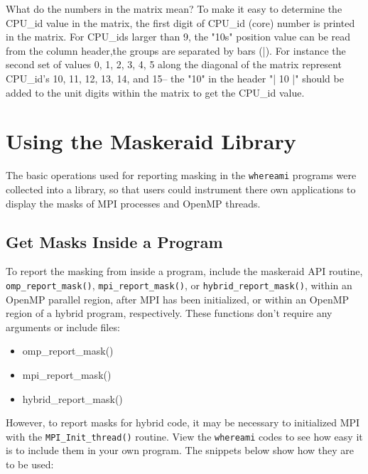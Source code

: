 \documentclass[10pt,a4paper]{report}
\begin{document}
What do the numbers in the matrix mean?
To make it easy to determine the CPU\_id value in the matrix, the first digit of
CPU\_id (core) number is printed in the matrix.  For CPU\_ids larger than 9, the
"10s" position value can be read from the column header,the groups are separated
by bars (|).  For instance the second set of values {0, 1, 2, 3, 4, 5} along the
diagonal of the matrix represent CPU\_id's { 10, 11, 12, 13, 14, and 15}-- the "10"
in the header "|       10     |" should be added to the unit digits within the matrix to get the
CPU\_id value.


\FloatBarrier
\chapter{Using the Maskeraid Library}

The basic operations used for reporting masking in the \verb+whereami+ programs
were collected into a library, so that users
could instrument there own applications to display the masks of MPI processes
and OpenMP threads.

 

\section{Get Masks Inside a Program}

To report the masking from inside a program, include the maskeraid API routine, \verb+omp_report_mask()+,
\verb+mpi_report_mask()+, or \verb+hybrid_report_mask()+, within an OpenMP parallel region, after MPI has been
initialized, or within an OpenMP region of a hybrid program, respectively.  These functions don't
require any arguments or include files:  

\begin{itemize}
\item omp\_report\_mask()
\item mpi\_report\_mask()
\item hybrid\_report\_mask()
\end{itemize}



However, to report masks for hybrid code, it may be necessary
to initialized MPI with the \verb+MPI_Init_thread()+ routine. View the \verb+whereami+ codes to see how easy
it is to include them in your own program. The snippets below show how they are to be used:
\end{document}
